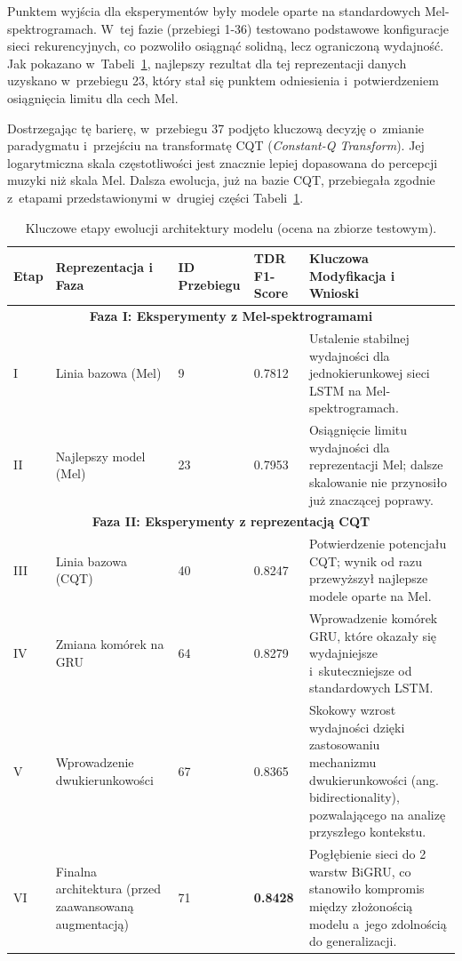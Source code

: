 Punktem wyjścia dla eksperymentów były modele oparte na standardowych Mel-spektrogramach. W~tej fazie (przebiegi 1-36) testowano podstawowe konfiguracje sieci rekurencyjnych, co pozwoliło osiągnąć solidną, lecz ograniczoną wydajność. Jak pokazano w~Tabeli~\ref{tab:ewolucja_architektury_calkowita}, najlepszy rezultat dla tej reprezentacji danych uzyskano w~przebiegu 23, który stał się punktem odniesienia i~potwierdzeniem osiągnięcia limitu dla cech Mel.

Dostrzegając tę barierę, w~przebiegu 37 podjęto kluczową decyzję o~zmianie paradygmatu i~przejściu na transformatę CQT (\textit{Constant-Q Transform}). Jej logarytmiczna skala częstotliwości jest znacznie lepiej dopasowana do percepcji muzyki niż skala Mel. Dalsza ewolucja, już na bazie CQT, przebiegała zgodnie z~etapami przedstawionymi w~drugiej części Tabeli~\ref{tab:ewolucja_architektury_calkowita}.

\begin{table}[H]
    \centering
    \caption{Kluczowe etapy ewolucji architektury modelu (ocena na zbiorze testowym).}
    \label{tab:ewolucja_architektury_calkowita}
    \begin{tabular}{|l|p{3cm}|p{2cm}|p{2cm}|p{6cm}|}
        \hline
        \textbf{Etap} & \textbf{Reprezentacja i Faza} & \textbf{ID Przebiegu} & \textbf{TDR F1-Score } & \textbf{Kluczowa Modyfikacja i Wnioski} \\ \hline
        \multicolumn{5}{|c|}{\textbf{Faza I: Eksperymenty z Mel-spektrogramami}} \\ \hline
        I & Linia bazowa (Mel) & 9 & 0.7812 & Ustalenie stabilnej wydajności dla jednokierunkowej sieci LSTM na Mel-spektrogramach. \\ \hline
        II & Najlepszy model (Mel) & 23 & 0.7953 & Osiągnięcie limitu wydajności dla reprezentacji Mel; dalsze skalowanie nie przynosiło już znaczącej poprawy. \\ \hline
        \multicolumn{5}{|c|}{\textbf{Faza II: Eksperymenty z reprezentacją CQT}} \\ \hline
        III & Linia bazowa (CQT) & 40 & 0.8247 & Potwierdzenie potencjału CQT; wynik od razu przewyższył najlepsze modele oparte na Mel. \\ \hline
        IV & Zmiana komórek na GRU & 64 & 0.8279 & Wprowadzenie komórek GRU, które okazały się wydajniejsze i~skuteczniejsze od standardowych LSTM. \\ \hline
        V & Wprowadzenie dwukierunkowości & 67 & 0.8365 & Skokowy wzrost wydajności dzięki zastosowaniu mechanizmu dwukierunkowości (ang. bidirectionality), pozwalającego na analizę przyszłego kontekstu. \\ \hline
        VI & Finalna architektura (przed zaawansowaną augmentacją) & 71 & \textbf{0.8428} & Pogłębienie sieci do 2 warstw BiGRU, co stanowiło kompromis między złożonością modelu a~jego zdolnością do generalizacji. \\ \hline
    \end{tabular}
\end{table}

